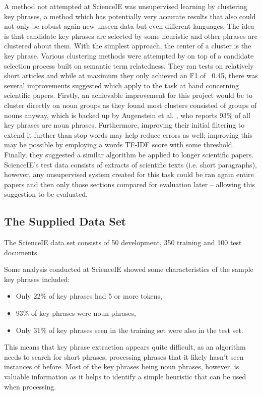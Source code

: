 A method not attempted at ScienceIE was unsupervised learning by clustering key phrases, a method which has potentially very accurate results that also could not only be robust again new unseen data but even different languages. The idea is that candidate key phrases are selected by some heuristic and other phrases are clustered about them. With the simplest approach, the center of a cluster is the key phrase. Various clustering methods were attempted by \cite{Liu2009} on top of a candidate selection process built on semantic term relatedness. They ran tests on relatively short articles and while at maximum they only achieved an F1 of ~0.45, there was several improvements suggested which apply to the task at hand concerning scientific papers. Firstly, an achievable improvement for this project would be to cluster directly on noun groups as they found most clusters consisted of groups of nouns anyway, which is backed up by Augenstein et al. \cite{Augenstein2017}, who reports 93\% of all key phrases are noun phrases. Furthermore, improving their initial filtering to extend it further than stop words may help reduce errors as well; improving this may be possible by employing a words TF-IDF score with some threshold. Finally, they suggested a similar algorithm be applied to longer scientific papers. ScienceIE’s test data consists of extracts of scientific texts (i.e. short paragraphs), however, any unsupervised system created for this task could be ran again entire papers and then only those sections compared for evaluation later – allowing this suggestion to be evaluated.

\subsection{The Supplied Data Set}
The ScienceIE data set consists of 50 development, 350 training and 100 test documents. 

Some analysis conducted at ScienceIE \cite{Augenstein2017} showed some characteristics of the sample key phrases included:
\begin{itemize}
	\item Only 22\% of key phrases had 5 or more tokens,
	\item 93\% of key phrases were noun phrases,
	\item Only 31\% of key phrases seen in the training set were also in the test set.
\end{itemize}

This means that key phrase extraction appears quite difficult, as an algorithm needs to search for short phrases, processing phrases that it likely hasn't seen instances of before. Most of the key phrases being noun phrases, however, is valuable information as it helps to identify a simple heuristic that can be used when processing.

